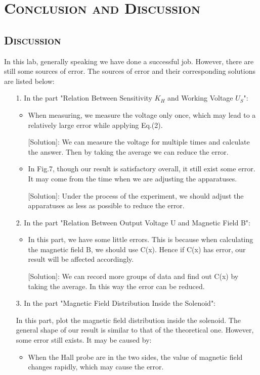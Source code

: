 \documentclass[a4paper,12pt]{article}
\begin{document}
\section{\textsc{Conclusion and Discussion}}
\subsection{\textsc{Discussion}}
In this lab, generally speaking we have done a successful job. However, there are still some sources of error. The sources of error and their corresponding solutions are listed below:
\begin{itemize}
\item[1.] In the part "Relation Between Sensitivity $K_H$ and Working Voltage $U_S$":
	\begin{itemize}
	\item When measuring, we measure the voltage only once, which may lead to a relatively large error while applying Eq.(2).
	
			[Solution]: We can measure the voltage for multiple times and calculate the answer. Then by taking the average we can reduce the error.
			
	\item In Fig.7, though our result is satisfactory overall, it still exist some error. It may come from the time when we are adjusting the apparatuses.
		
			[Solution]: Under the process of the experiment, we should adjust the apparatuses as less as possible to reduce the error.
	\end{itemize}
	
\item[2.] In the part "Relation Between Output Voltage U and Magnetic Field B":
	\begin{itemize}
	\item In this part, we have some little errors. This is because when calculating the magnetic field B, we should use C(x). Hence if C(x) has error, our result will be affected accordingly.
	
			[Solution]: We can record more groups of data and find out C(x) by taking the average. In this way the error can be reduced.
	\end{itemize}
	
\item[3.] In the part "Magnetic Field Distribution Inside the Solenoid":
\par 	In this part, plot the magnetic field distribution inside the solenoid. The general shape of our result is similar to that of the theoretical one. However, some error still exists. It may be caused by:
	\begin{itemize}
	\item When the Hall probe are in the two sides, the value of magnetic field changes rapidly, which may cause the error.
	

\end{itemize}
\end{itemize}
\end{document}
